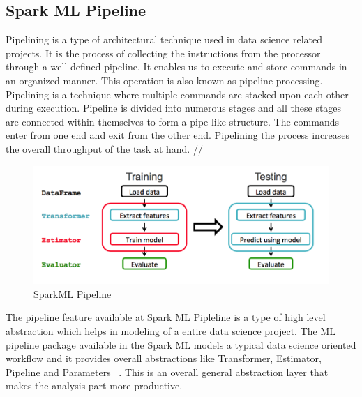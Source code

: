 \begin{enumerate}
\subsection{Spark ML Pipeline}
Pipelining is a type of architectural technique used in data science related projects. 
It is the process of collecting the instructions from the processor through a well defined 
pipeline. It enables us to execute and store commands in an organized manner. This operation is also known as 
pipeline processing. Pipelining is a technique where multiple commands are 
stacked upon each other during execution. Pipeline is divided into numerous stages and all these stages 
are connected within themselves to form a pipe like structure. The commands enter 
from one end and exit from the other end. Pipelining the process increases the overall throughput of the task at hand. //

\begin{figure}[!ht]
\centering\includegraphics[width=\columnwidth]{images/spark_pipeline.png}
\caption{SparkML Pipeline~\cite{hid-sp18-418-spark-pipeline}}
\label{f:Pipeline in SparkML}
\end{figure}

The pipeline feature available at Spark ML Pipleline is a type of high level abstraction which helps 
in modeling of a entire data science project. The ML pipeline package available in the Spark ML models a 
typical data science oriented workflow and it provides overall abstractions like Transformer, Estimator, 
Pipeline and Parameters ~\cite{hid-sp18-418-spark}. This is an overall general abstraction 
layer that makes the analysis part more productive.


\end{enumerate}

